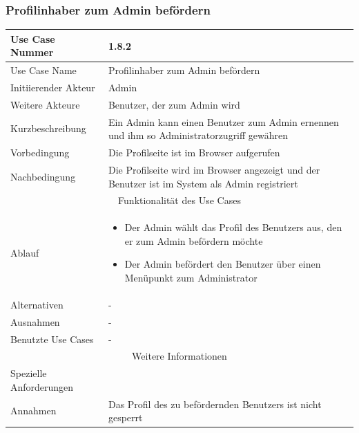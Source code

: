 \documentclass[10pt,a4paper]{article}
\begin{document}
			\subsubsection{Profilinhaber zum Admin bef\"ordern}
		\begin{tabular}{|l|p{.5\linewidth}|}
		\hline Use Case Nummer & 1.8.2 \\ 
		\hline Use Case Name & Profilinhaber zum Admin bef\"ordern \\ 
		\hline Initiierender Akteur & Admin \\
		\hline Weitere Akteure & Benutzer, der zum Admin wird \\
		\hline Kurzbeschreibung & Ein Admin kann einen Benutzer zum Admin ernennen und ihm so Administratorzugriff gew\"ahren \\
		\hline Vorbedingung & Die Profilseite ist im Browser aufgerufen \\
		\hline Nachbedingung & Die Profilseite wird im Browser angezeigt und der Benutzer ist im System als Admin registriert \\
		\hline \multicolumn{2}{|c|}{Funktionalität des Use Cases}\\
		\hline  Ablauf & \begin{itemize}
					\item Der Admin w\"ahlt das Profil des Benutzers aus, den er zum Admin bef\"ordern m\"ochte
					\item Der Admin bef\"ordert den Benutzer \"uber einen Men\"upunkt zum Administrator
				\end{itemize}\\
		\hline Alternativen & - \\
		\hline Ausnahmen & - \\
		\hline Benutzte Use Cases & - \\
		\hline \multicolumn{2}{|c|}{Weitere Informationen} \\
		\hline Spezielle Anforderungen &  \\
		\hline Annahmen & Das Profil des zu bef\"ordernden Benutzers ist nicht gesperrt \\
		\hline
		\end{tabular}
		
\end{document}
